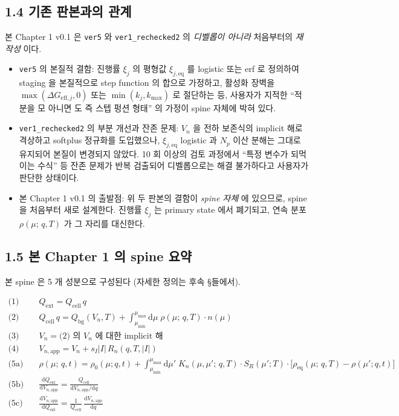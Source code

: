 \documentclass[11pt,a4paper]{article}
\newcommand{\dd}{\mathrm{d}}
\newcommand{\app}{\mathrm{app}}
\newcommand{\eff}{\mathrm{eff}}
\newcommand{\eq}{\mathrm{eq}}
\newcommand{\bg}{\mathrm{bg}}
\newcommand{\cell}{\mathrm{cell}}
\newcommand{\ext}{\mathrm{ext}}
\newcommand{\mucont}{\mu}
\newcommand{\rhomu}{\rho(\mucont;\, q, T)}
\newcommand{\rhoeq}{\rho_{\eq}(\mucont;\, q, T)}
\newcommand{\rhomut}{\rho(\mucont;\, q, t)}
\newcommand{\Kncross}{K_n(\mucont, \mucont';\, q, T)}
\newcommand{\nmu}{n(\mucont)}
\begin{document}
\subsection*{1.4 기존 판본과의 관계}

본 Chapter 1 v0.1 은 \texttt{ver5} 와 \texttt{ver1\_rechecked2} 의 \emph{디벨롭이
아니라} 처음부터의 \emph{재작성} 이다.

\begin{itemize}
\item \texttt{ver5} 의 본질적 결함: 진행률 $\xi_j$ 의 평형값 $\xi_{j,\eq}$ 를
      logistic 또는 erf 로 정의하여 staging 을 본질적으로 step function 의 합으로
      가정하고, 활성화 장벽을 $\max(\Delta G_{\eff,j}, 0)$ 또는
      $\min(k_j, k_{\max})$ 로 절단하는 등, 사용자가 지적한
      ``적분을 모 아니면 도 즉 스텝 펑션 형태'' 의 가정이 spine 자체에 박혀 있다.
\item \texttt{ver1\_rechecked2} 의 부분 개선과 잔존 문제: $V_n$ 을 전하 보존식의
      implicit 해로 격상하고 softplus 정규화를 도입했으나, $\xi_{j,\eq}$ logistic
      과 $N_p$ 이산 분해는 그대로 유지되어 본질이 변경되지 않았다. 10 회 이상의
      검토 과정에서 ``특정 변수가 되먹이는 수식'' 등 잔존 문제가 반복 검출되어
      디벨롭으로는 해결 불가하다고 사용자가 판단한 상태이다.
\item 본 Chapter 1 v0.1 의 출발점: 위 두 판본의 결함이 \emph{spine 자체} 에
      있으므로, spine 을 처음부터 새로 설계한다. 진행률 $\xi_j$ 는 primary
      state 에서 폐기되고, 연속 분포 $\rhomu$ 가 그 자리를 대신한다.
\end{itemize}

\subsection*{1.5 본 Chapter 1 의 spine 요약}

본 spine 은 5 개 성분으로 구성된다 (자세한 정의는 후속 \S 들에서).

\begin{equation}
\boxed{
\begin{aligned}
\text{(1)} \quad & Q_{\ext} = Q_{\cell}\, q \\
\text{(2)} \quad & Q_{\cell}\, q = Q_{\bg}(V_n, T) +
                   \int_{\mucont_{\min}}^{\mucont_{\max}} \dd\mucont \;
                   \rhomu \cdot \nmu \\
\text{(3)} \quad & V_n = \text{(2) 의 } V_n \text{ 에 대한 implicit 해} \\
\text{(4)} \quad & V_{n,\app} = V_n + s_I |I|\, R_n(q, T, |I|) \\
\text{(5a)} \quad & \rhomut = \rho_0(\mucont; q, t) +
                   \int_{\mucont_{\min}}^{\mucont_{\max}} \dd\mucont'\;
                   \Kncross \cdot S_R(\mucont'; T) \cdot
                   \bigl[\rhoeq - \rho(\mucont'; q, t)\bigr] \\
\text{(5b)} \quad & \frac{\dd Q_{\ext}}{\dd V_{n,\app}}
                   = \frac{Q_{\cell}}{\dd V_{n,\app}/\dd q} \\
\text{(5c)} \quad & \frac{\dd V_{n,\app}}{\dd Q_{\ext}}
                   = \frac{1}{Q_{\cell}}\, \frac{\dd V_{n,\app}}{\dd q}
\end{aligned}
}
\label{eq:spine_summary}
\end{equation}
\end{document}
